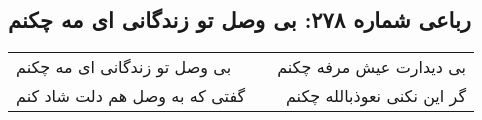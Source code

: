 \begin{center}
\section*{رباعی شماره ۲۷۸: بی وصل تو زندگانی ای مه چکنم}
\label{sec:sh278}
\begin{longtable}{l p{0.5cm} r}
بی وصل تو زندگانی ای مه چکنم
&&
بی دیدارت عیش مرفه چکنم
\\
گفتی که به وصل هم دلت شاد کنم
&&
گر این نکنی نعوذبالله چکنم
\\
\end{longtable}
\end{center}
